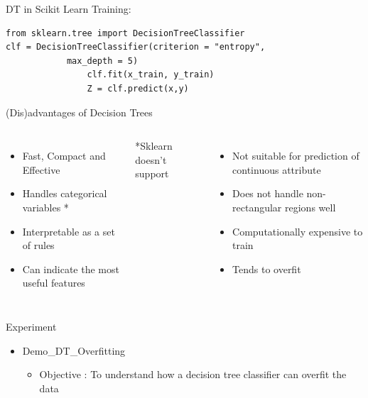 \documentclass[aspectratio=169, 14pt]{beamer}
\begin{document}
\begin{frame}[t,fragile]{\hspace{3ex}DT in Scikit Learn}
\alert{Training:}
\begin{verbatim}
from sklearn.tree import DecisionTreeClassifier
clf = DecisionTreeClassifier(criterion = "entropy",
        	max_depth = 5)
				clf.fit(x_train, y_train)
				Z = clf.predict(x,y)
		\end{verbatim}

\end{frame}

\begin{frame}{(Dis)advantages of Decision Trees }
	\begin{columns}
		\column{7cm}
		\begin{itemize}	
				\small
			\item Fast, Compact and Effective
			\item Handles categorical variables *
			\item Interpretable as a set of rules
			\item Can indicate the most useful features
			\end{itemize}
		\hspace{1cm}		\small{\alert{*Sklearn doesn\rq t support}}
			\column{9cm}
			\begin{itemize}
					\vspace{-1cm}	\small
			\item Not suitable for prediction of continuous attribute 
			\item Does not handle non-rectangular regions well
			\item Computationally expensive to train
			\item Tends to overfit
			\end{itemize}
	\end{columns}
\end{frame}


\begin{frame}{Experiment}
	\begin{itemize}
	    \item {Demo\_DT\_Overfitting}
			\begin{itemize}
				\item Objective : To understand how a decision tree classifier can overfit the data
			\end{itemize}
	
	\end{itemize}
\end{frame}
\end{document}
